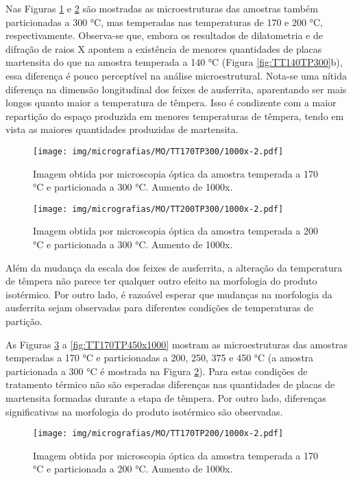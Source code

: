 Nas Figuras \ref{fig:TT170TP300x1000} e \ref{fig:TT200TP300x1000} são mostradas as microestruturas das amostras também particionadas a 300 °C, mas temperadas nas temperaturas de 170 e 200 °C, respectivamente. Observa-se que, embora os resultados de dilatometria e de difração de raios X apontem a existência de menores quantidades de placas martensita do que na amostra temperada a 140 °C (Figura \ref{fig:TT140TP300}b), essa diferença é pouco perceptível na análise microestrutural. Nota-se uma nítida diferença na dimensão longitudinal dos feixes de ausferrita, aparentando ser mais longos quanto maior a temperatura de têmpera. Isso é condizente com a maior repartição do espaço produzida em menores temperaturas de têmpera, tendo em vista as maiores quantidades produzidas de martensita.

\begin{figure}
	\texttt{[image: img/micrografias/MO/TT170TP300/1000x-2.pdf]}
	\caption{Imagem obtida por microscopia óptica da amostra temperada a 170 °C e particionada a 300 °C. Aumento de 1000x.}
	\label{fig:TT170TP300x1000}
\end{figure}

\begin{figure}
	\texttt{[image: img/micrografias/MO/TT200TP300/1000x-2.pdf]}
	\caption{Imagem obtida por microscopia óptica da amostra temperada a 200 °C e particionada a 300 °C. Aumento de 1000x.}
	\label{fig:TT200TP300x1000}
\end{figure}

Além da mudança da escala dos feixes de ausferrita, a alteração da temperatura de têmpera não parece ter qualquer outro efeito na morfologia do produto isotérmico. Por outro lado, é razoável esperar que mudanças na morfologia da ausferrita sejam observadas para diferentes condições de temperaturas de partição.

As Figuras \ref{fig:TT170TP200x1000} a \ref{fig:TT170TP450x1000} mostram as microestruturas das amostras temperadas a 170 °C e particionadas a 200, 250, 375 e 450 °C (a amostra particionada a 300 °C é mostrada na Figura \ref{fig:TT200TP300x1000}). Para estas condições de tratamento térmico não são esperadas diferenças nas quantidades de placas de martensita formadas durante a etapa de têmpera. Por outro lado, diferenças significativas na morfologia do produto isotérmico são observadas.

\begin{figure}
	\texttt{[image: img/micrografias/MO/TT170TP200/1000x-2.pdf]}
	\caption{Imagem obtida por microscopia óptica da amostra temperada a 170 °C e particionada a 200 °C. Aumento de 1000x.}
	\label{fig:TT170TP200x1000}
\end{figure}

